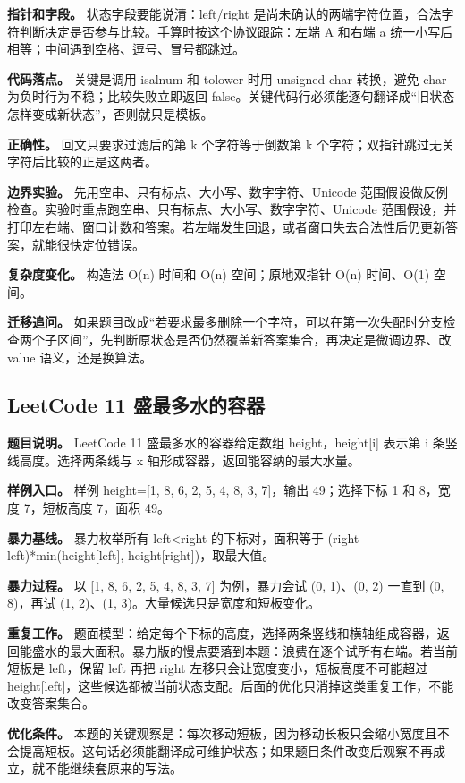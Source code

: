 \textbf{指针和字段。} 状态字段要能说清：left/right 是尚未确认的两端字符位置，合法字符判断决定是否参与比较。手算时按这个协议跟踪：左端 A 和右端 a 统一小写后相等；中间遇到空格、逗号、冒号都跳过。

\textbf{代码落点。} 关键是调用 isalnum 和 tolower 时用 unsigned char 转换，避免 char 为负时行为不稳；比较失败立即返回 false。关键代码行必须能逐句翻译成“旧状态怎样变成新状态”，否则就只是模板。

\textbf{正确性。} 回文只要求过滤后的第 k 个字符等于倒数第 k 个字符；双指针跳过无关字符后比较的正是这两者。

\textbf{边界实验。} 先用空串、只有标点、大小写、数字字符、Unicode 范围假设做反例检查。实验时重点跑空串、只有标点、大小写、数字字符、Unicode 范围假设，并打印左右端、窗口计数和答案。若左端发生回退，或者窗口失去合法性后仍更新答案，就能很快定位错误。

\textbf{复杂度变化。} 构造法 O(n) 时间和 O(n) 空间；原地双指针 O(n) 时间、O(1) 空间。

\textbf{迁移追问。} 如果题目改成“若要求最多删除一个字符，可以在第一次失配时分支检查两个子区间”，先判断原状态是否仍然覆盖新答案集合，再决定是微调边界、改 value 语义，还是换算法。

\subsection{LeetCode 11 盛最多水的容器}

\textbf{题目说明。} LeetCode 11 盛最多水的容器给定数组 height，height[i] 表示第 i 条竖线高度。选择两条线与 x 轴形成容器，返回能容纳的最大水量。

\textbf{样例入口。} 样例 height=[1, 8, 6, 2, 5, 4, 8, 3, 7]，输出 49；选择下标 1 和 8，宽度 7，短板高度 7，面积 49。

\textbf{暴力基线。} 暴力枚举所有 left<right 的下标对，面积等于 (right-left)*min(height[left], height[right])，取最大值。

\textbf{暴力过程。} 以 [1, 8, 6, 2, 5, 4, 8, 3, 7] 为例，暴力会试 (0, 1)、(0, 2) 一直到 (0, 8)，再试 (1, 2)、(1, 3)。大量候选只是宽度和短板变化。

\textbf{重复工作。} 题面模型：给定每个下标的高度，选择两条竖线和横轴组成容器，返回能盛水的最大面积。暴力版的慢点要落到本题：浪费在逐个试所有右端。若当前短板是 left，保留 left 再把 right 左移只会让宽度变小，短板高度不可能超过 height[left]，这些候选都被当前状态支配。后面的优化只消掉这类重复工作，不能改变答案集合。

\textbf{优化条件。} 本题的关键观察是：每次移动短板，因为移动长板只会缩小宽度且不会提高短板。这句话必须能翻译成可维护状态；如果题目条件改变后观察不再成立，就不能继续套原来的写法。

